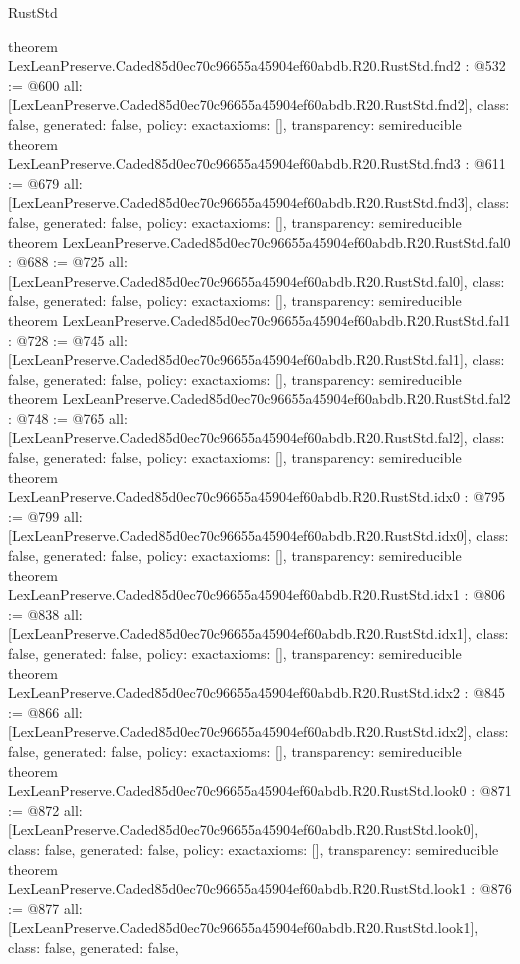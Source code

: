 \begin{lexlean}{RustStd}
\begin{coremodule}
{}
theorem LexLeanPreserve.Caded85d0ec70c96655a45904ef60abdb.R20.RustStd.fnd2 : @532 := @600 {
  all: [LexLeanPreserve.Caded85d0ec70c96655a45904ef60abdb.R20.RustStd.fnd2],
  class: false,
  generated: false,
  policy: exact{axioms: []},
  transparency: semireducible
}
theorem LexLeanPreserve.Caded85d0ec70c96655a45904ef60abdb.R20.RustStd.fnd3 : @611 := @679 {
  all: [LexLeanPreserve.Caded85d0ec70c96655a45904ef60abdb.R20.RustStd.fnd3],
  class: false,
  generated: false,
  policy: exact{axioms: []},
  transparency: semireducible
}
theorem LexLeanPreserve.Caded85d0ec70c96655a45904ef60abdb.R20.RustStd.fal0 : @688 := @725 {
  all: [LexLeanPreserve.Caded85d0ec70c96655a45904ef60abdb.R20.RustStd.fal0],
  class: false,
  generated: false,
  policy: exact{axioms: []},
  transparency: semireducible
}
theorem LexLeanPreserve.Caded85d0ec70c96655a45904ef60abdb.R20.RustStd.fal1 : @728 := @745 {
  all: [LexLeanPreserve.Caded85d0ec70c96655a45904ef60abdb.R20.RustStd.fal1],
  class: false,
  generated: false,
  policy: exact{axioms: []},
  transparency: semireducible
}
theorem LexLeanPreserve.Caded85d0ec70c96655a45904ef60abdb.R20.RustStd.fal2 : @748 := @765 {
  all: [LexLeanPreserve.Caded85d0ec70c96655a45904ef60abdb.R20.RustStd.fal2],
  class: false,
  generated: false,
  policy: exact{axioms: []},
  transparency: semireducible
}
theorem LexLeanPreserve.Caded85d0ec70c96655a45904ef60abdb.R20.RustStd.idx0 : @795 := @799 {
  all: [LexLeanPreserve.Caded85d0ec70c96655a45904ef60abdb.R20.RustStd.idx0],
  class: false,
  generated: false,
  policy: exact{axioms: []},
  transparency: semireducible
}
theorem LexLeanPreserve.Caded85d0ec70c96655a45904ef60abdb.R20.RustStd.idx1 : @806 := @838 {
  all: [LexLeanPreserve.Caded85d0ec70c96655a45904ef60abdb.R20.RustStd.idx1],
  class: false,
  generated: false,
  policy: exact{axioms: []},
  transparency: semireducible
}
theorem LexLeanPreserve.Caded85d0ec70c96655a45904ef60abdb.R20.RustStd.idx2 : @845 := @866 {
  all: [LexLeanPreserve.Caded85d0ec70c96655a45904ef60abdb.R20.RustStd.idx2],
  class: false,
  generated: false,
  policy: exact{axioms: []},
  transparency: semireducible
}
theorem LexLeanPreserve.Caded85d0ec70c96655a45904ef60abdb.R20.RustStd.look0 : @871 := @872 {
  all: [LexLeanPreserve.Caded85d0ec70c96655a45904ef60abdb.R20.RustStd.look0],
  class: false,
  generated: false,
  policy: exact{axioms: []},
  transparency: semireducible
}
theorem LexLeanPreserve.Caded85d0ec70c96655a45904ef60abdb.R20.RustStd.look1 : @876 := @877 {
  all: [LexLeanPreserve.Caded85d0ec70c96655a45904ef60abdb.R20.RustStd.look1],
  class: false,
  generated: false,
}
\end{coremodule}
\end{lexlean}
